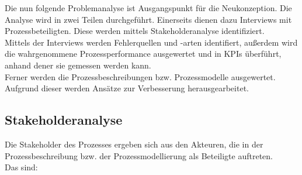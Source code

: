 Die nun folgende Problemanalyse ist Ausgangspunkt für die Neukonzeption.
Die Analyse wird in zwei Teilen durchgeführt.
Einerseits dienen dazu Interviews mit Prozessbeteiligten. 
Diese werden mittels Stakeholderanalyse identifiziert.\\
Mittels der Interviews werden Fehlerquellen und -arten identifiert, außerdem wird die wahrgenommene Prozessperformance ausgewertet und in KPIs überführt, anhand dener sie gemessen werden kann.\\
Ferner werden die Prozessbeschreibungen bzw. Prozessmodelle ausgewertet.
Aufgrund dieser werden Ansätze zur Verbesserung herausgearbeitet.

\subsection{Stakeholderanalyse}
Die Stakeholder des Prozesses ergeben sich aus den Akteuren, die in der Prozessbeschreibung bzw. der Prozessmodellierung als Beteiligte auftreten.\\
Das sind:


